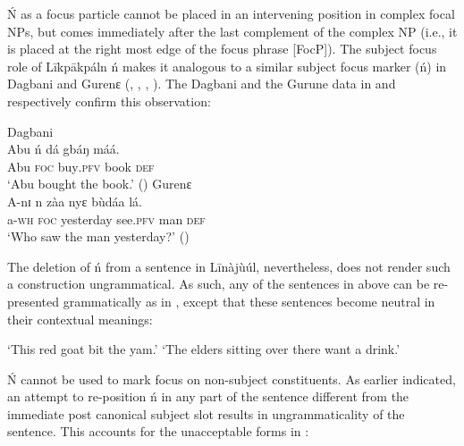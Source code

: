 \documentclass[output=paper,colorlinks,citecolor=brown]{langscibook}
\begin{document}
Ń as a focus particle cannot be placed in an intervening position in complex focal NPs, but comes immediately after the last complement of the complex NP (i.e., it is placed at the right most edge of the focus phrase [FocP]). The subject focus role of Līkpākpáln ń makes it analogous to a similar subject focus marker (ń) in Dagbani and Gurenɛ (\citealt[4]{Dakubu2003}, \citealt[169]{Issah2013Focus}, \citealt[5]{IssahSmith2018}, \citealt[169]{Akrofi-Ansah2014}). The Dagbani and the Gurune data in  and  respectively confirm this observation:

\ea%
    \label{ex:bisilki:10}
    \ea\label{ex:bisilki:10a}
    Dagbani\\
    \gll    Abu	ń	dá		gbáŋ	máá.\\
            Abu	\textsc{foc}	buy\textsc{.pfv}	book	\textsc{def}\\
    \glt    ‘Abu bought the book.’ \hfill (\citealt[5]{IssahSmith2018})
    \ex\label{ex:bisilki:10b}
    Gurenɛ\\
    \gll    A-nɪ	n	zàa		nyɛ		bùdáa	lá.\\
            a\textsc{-wh}	\textsc{foc}	yesterday	see\textsc{.pfv}	man	\textsc{def}\\
    \glt    ‘Who saw the man yesterday?’ \hfill (\citealt[4]{Dakubu2003})
    \z
\z

The deletion of ń from a sentence in Līnàjùúl, nevertheless, does not render such a construction ungrammatical. As such, any of the sentences in  above can be re-presented grammatically as in , except that these sentences become neutral in their contextual meanings:

\ea%
    \label{ex:bisilki:11}
    \jambox*{[neutral]}
    \glt    ‘This red goat bit the yam.’
    \jambox*{[neutral]}
    \glt    ‘The elders sitting over there want a drink.’
    \z
\z

Ń cannot be used to mark focus on non-subject constituents. As earlier indicated, an attempt to re-position ń in any part of the sentence different from the immediate post canonical subject slot results in ungrammaticality of the sentence. This accounts for the unacceptable forms in :
\end{document}
